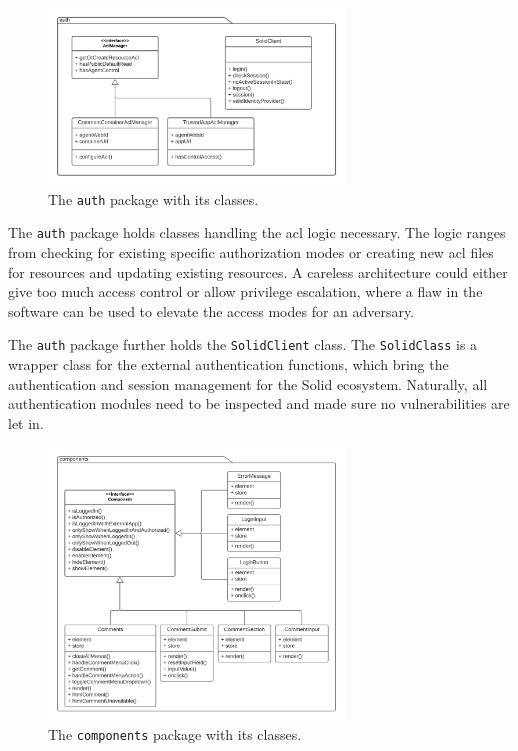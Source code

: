 \begin{figure}[!ht]
    \centering
    \includegraphics[width=0.7\textwidth]{prototype/graphs/poc-comment-package-auth.png}
    \caption{The \texttt{auth} package with its classes.}
    \label{fig:poc-comment-package-auth}
\end{figure}

The \texttt{auth} package holds classes handling the \gls{acl} logic necessary. The logic ranges from checking for existing specific authorization modes or creating new \gls{acl} files for resources and updating existing resources. A careless architecture could either give too much access control or allow privilege escalation, where a flaw in the software can be used to elevate the access modes for an adversary.

The \texttt{auth} package further holds the \texttt{SolidClient} class. The \texttt{SolidClass} is a wrapper class for the external authentication functions, which bring the authentication and session management for the Solid ecosystem. Naturally, all authentication modules need to be inspected and made sure no vulnerabilities are let in.

\begin{figure}[H]
    \centering
    \includegraphics[width=0.7\textwidth]{prototype/graphs/poc-comment-package-components.png}
    \caption{The \texttt{components} package with its classes.}
    \label{fig:poc-comment-package-components}
\end{figure}

